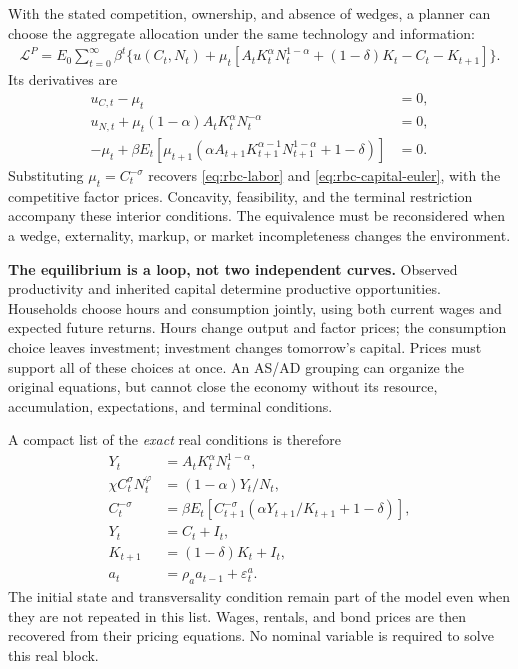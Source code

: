 With the stated competition, ownership, and absence of wedges, a planner can
choose the aggregate allocation under the same technology and information:
\begin{align}
\mathscr L^P=E_0\sum_{t=0}^\infty\beta^t\{u(C_t,N_t)
 +\mu_t[A_tK_t^\alpha N_t^{1-\alpha}+(1-\delta)K_t-C_t-K_{t+1}]\}.
\end{align}
Its derivatives are
\begin{align}
u_{C,t}-\mu_t&=0,\\
u_{N,t}+\mu_t(1-\alpha)A_tK_t^\alpha N_t^{-\alpha}&=0,\\
-\mu_t+\beta E_t[\mu_{t+1}
 (\alpha A_{t+1}K_{t+1}^{\alpha-1}N_{t+1}^{1-\alpha}+1-\delta)]&=0.
\end{align}
Substituting $\mu_t=C_t^{-\sigma}$ recovers
\eqref{eq:rbc-labor} and \eqref{eq:rbc-capital-euler}, with the competitive
factor prices. Concavity, feasibility, and the terminal restriction accompany
these interior conditions. The equivalence must be reconsidered when a wedge,
externality, markup, or market incompleteness changes the environment.

\begin{greenblock}
\textbf{The equilibrium is a loop, not two independent curves.}
Observed productivity and inherited capital determine productive opportunities.
Households choose hours and consumption jointly, using both current wages and
expected future returns. Hours change output and factor prices; the consumption
choice leaves investment; investment changes tomorrow's capital. Prices must
support all of these choices at once. An AS/AD grouping can organize the
original equations, but cannot close the economy without its resource,
accumulation, expectations, and terminal conditions.
\end{greenblock}

A compact list of the \emph{exact} real conditions is therefore
\begin{align}
Y_t&=A_tK_t^\alpha N_t^{1-\alpha},\\
\chi C_t^\sigma N_t^\varphi&=(1-\alpha)Y_t/N_t,\\
C_t^{-\sigma}&=\beta E_t[C_{t+1}^{-\sigma}
 (\alpha Y_{t+1}/K_{t+1}+1-\delta)],\\
Y_t&=C_t+I_t,\\
K_{t+1}&=(1-\delta)K_t+I_t,\\
a_t&=\rho_a a_{t-1}+\varepsilon_t^a.
\end{align}
The initial state and transversality condition remain part of the model even
when they are not repeated in this list. Wages, rentals, and bond prices are
then recovered from their pricing equations. No nominal variable is required
to solve this real block.

